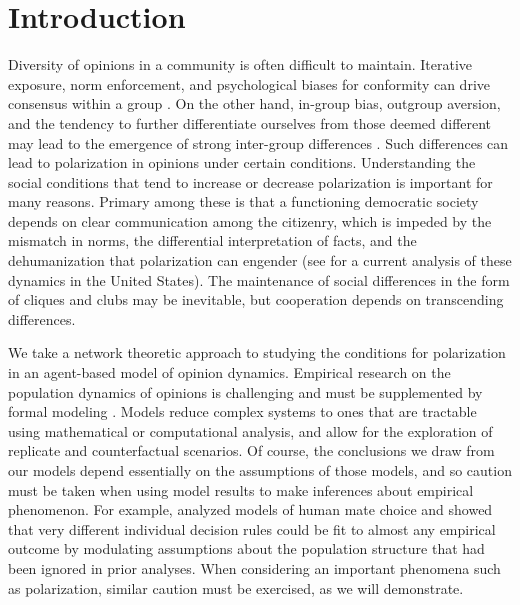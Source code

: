 \section{Introduction}

Diversity of opinions in a community is often difficult to maintain. Iterative exposure, norm
enforcement, and psychological biases for conformity can drive consensus within
a group \cite{DeGroot1974,deffuant2000mixing,henrich1998evolution,smaldino2015social,efferson2008conformists,muthukrishna2016and}.
On the other hand, in-group bias, outgroup aversion, and the
tendency to further differentiate ourselves from those deemed different may lead to the
emergence of strong inter-group differences \cite{tajfel1971social,Lord1979,carley1990group,Axelrod1997,mark1998beyond,mcelreath2003shared,Dandekar2013,gray2014emergence,smaldino2017adoption}.
Such differences
can lead to polarization in opinions under certain conditions.  Understanding
the social conditions that tend to increase or decrease polarization is
important for many reasons. Primary among these is that a functioning 
democratic society
depends on clear communication among the citizenry, which is impeded by the
mismatch in norms, the differential interpretation of facts, and the
dehumanization that polarization can engender (see 
for a current analysis of these dynamics in the United States). 
The maintenance of social differences in the form of cliques and clubs 
may be inevitable, but cooperation depends on transcending differences. 

We take a network theoretic approach to studying the conditions for polarization in an agent-based model of opinion dynamics. Empirical research on the population dynamics of opinions is challenging and must be supplemented by formal modeling 
\cite{flache2017models}. 
Models reduce complex systems to ones that are tractable using mathematical or computational analysis, and allow for the exploration of replicate and counterfactual scenarios. Of course, the conclusions we draw from our models depend essentially on the assumptions of those models, and so caution must be taken when using model results to make inferences about empirical phenomenon. For example,  analyzed models of human mate choice and showed that very different individual decision rules could be fit to almost any empirical outcome by modulating assumptions about the population structure that had been ignored in prior analyses. When considering an important phenomena such as polarization, similar caution must be exercised, as we will demonstrate. 

